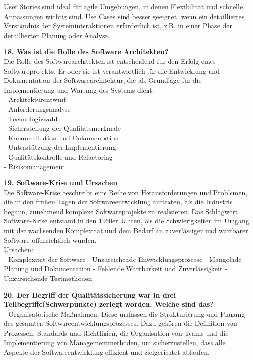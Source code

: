 \documentclass{article}
\begin{document}
User Stories sind ideal für agile Umgebungen, in denen Flexibilität und schnelle Anpassungen wichtig sind. Use Cases sind besser geeignet, wenn ein detailliertes Verständnis der Systeminteraktionen erforderlich ist, z.B. in einer Phase der detaillierten Planung oder Analyse.\\
\textbf{18. Was ist die Rolle des Software Architekten?}\\
Die Rolle des Softwarearchitekten ist entscheidend für den Erfolg eines Softwareprojekts. Er oder sie ist verantwortlich für die Entwicklung und Dokumentation der Softwarearchitektur, die als Grundlage für die Implementierung und Wartung des Systems dient.\\
- Architekturentwurf \\
- Anforderungsanalyse \\
- Technologiewahl \\
- Sicherstellung der Qualitätsmerkmale \\
- Kommunikation und Dokumentation \\
- Unterstützung der Implementierung \\
- Qualitätskontrolle und Refactoring \\
- Risikomanagement \\
\textbf{19. Software-Krise und Ursachen}\\
Die Software-Krise beschreibt eine Reihe von Herausforderungen und Problemen, die in den frühen Tagen der Softwareentwicklung auftraten, als die Industrie begann, zunehmend komplexe Softwareprojekte zu realisieren. Das Schlagwort Software-Krise entstand in den 1960er Jahren, als die Schwierigkeiten im Umgang mit der wachsenden Komplexität und dem Bedarf an zuverlässiger und wartbarer Software offensichtlich wurden.\\
Ursachen: \\
- Komplexität der Software
- Unzureichende Entwicklungsprozesse
- Mangelnde Planung und Dokumentation
- Fehlende Wartbarkeit und Zuverlässigkeit
- Unzureichende Testmethoden\\
\textbf{20. Der Begriff der Qualitätssicherung war in drei Teilbegriffe(Schwerpunkte) zerlegt worden. Welche sind das?}\\
- Organisatorische Maßnahmen: Diese umfassen die Strukturierung und Planung des gesamten Softwareentwicklungsprozesses. Dazu gehören die Definition von Prozessen, Standards und Richtlinien, die Organisation von Teams und die Implementierung von Managementmethoden, um sicherzustellen, dass alle Aspekte der Softwareentwicklung effizient und zielgerichtet ablaufen.\\
\end{document}
